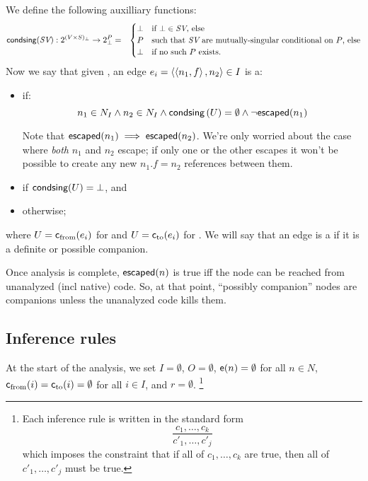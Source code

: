 \documentclass[11pt,notitlepage]{article}
\newcommand{\bigvar}[1]{\ensuremath{\text{\it #1}}}
\newcommand{\func}[1]{\ensuremath{\text{\sffamily #1}}}
\newcommand{\ptgraphA}
           {\tuple{O,I,\func{c}_\text{from},\func{c}_\text{to},r}}
\begin{document}
We define the following auxilliary functions:
\begin{eqnarray*}
\func{condsing}(\bigvar{SV}):2^{(V\times S)_\bot}\to 2^P_\bot &=& \begin{cases}
\bot & \text{if }\bot\in\bigvar{SV}\text{, else}\\
P&\text{such that }\bigvar{SV}\text{ are mutually-singular conditional
                                     on }P\text{, else} \\
\bot & \text{if no such }P\text{ exists.}
\end{cases}
\end{eqnarray*}
Now we say that given \ptgraphA,
an edge $e_i=\left\langle \left\langle n_1,f \right\rangle,n_2 \right\rangle \in I$ is a:
\begin{itemize}
\item {} if:
\[
 n_1\in N_I \wedge n_2\in N_I \wedge
 \func{condsing}\left(U\right)=\emptyset \wedge
 \neg\func{escaped}(n_1)
\]

Note that $\func{escaped}(n_1)\implies\func{escaped}(n_2)$.  
We're only worried about the case where {\it both} $n_1$ and $n_2$
escape; if only one or the other escapes it won't be possible to
create any new $n_1.f=n_2$ references between them.
\item {} if \(
 \func{condsing}(U) = \bot
\), and
\item {} otherwise;
\end{itemize}
where 
$U=\func{c}_\text{from}(e_i)$ for  and
$U=\func{c}_\text{to}(e_i)$ for .
We will say that an edge is a  if it is a
definite or possible companion.  

Once analysis is complete, $\func{escaped}(n)$ is true iff the node
can be reached from unanalyzed (incl native) code.  So, at that point,
``possibly companion'' nodes are companions unless the unanalyzed code
kills them.

\subsection{Inference rules}
At the start of the analysis, we set $I=\emptyset$, $O=\emptyset$,
$\func{e}(n)=\emptyset$ for all $n\in N$, 
$\func{c}_\text{from}(i)=\func{c}_\text{to}(i)=\emptyset$ for all $i\in I$,
and $r=\emptyset$.%
\footnote{
Each inference rule is written in the standard form
\[\dfrac{c_1,\ldots,c_k}{c'_1,\ldots,c'_j}\]
which imposes the constraint that if all of $c_1,\ldots,c_k$ are true,
then all of $c'_1,\ldots,c'_j$ must be true.
}
\end{document}
